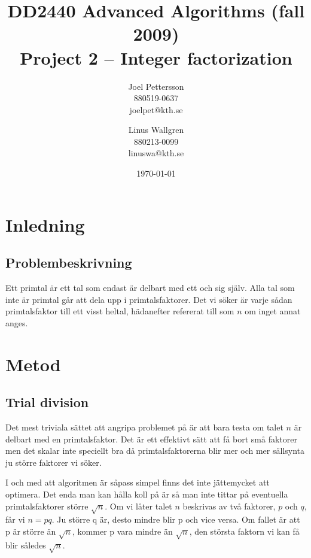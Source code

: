 \documentclass[a4paper,12pt]{article}
\renewcommand{\*}{\ensuremath{\cdot}}
\begin{document}
\title{DD2440 Advanced Algorithms (fall 2009) \\ Project 2 -- Integer
factorization}
\author{Joel Pettersson \\ 880519-0637 \\ joelpet@kth.se \and Linus Wallgren \\
880213-0099  \\ linuswa@kth.se}
\date{\today}
\maketitle
\thispagestyle{empty}
\newpage
\setcounter{page}{1}


\section{Inledning}

\subsection{Problembeskrivning}

Ett primtal är ett tal som endast är delbart med ett och sig själv. Alla tal som
inte är primtal går att dela upp i primtalsfaktorer. Det vi söker är varje sådan
primtalsfaktor till ett visst heltal, hädanefter refererat till som $n$ om inget
annat anges.




\section{Metod}

\subsection{Trial division}

Det mest triviala sättet att angripa problemet på är att bara testa om talet $n$ är delbart med en primtalsfaktor. Det är ett effektivt sätt att få bort små faktorer men det skalar inte speciellt bra då primtalsfaktorerna blir mer och mer sällsynta ju större faktorer vi söker.

I och med att algoritmen är såpass simpel finns det inte jättemycket att optimera. Det enda man kan hålla koll på är så man inte tittar på eventuella primtalsfaktorer större $\sqrt{n}$. Om vi låter talet $n$ beskrivas av två faktorer, $p$ och $q$, får vi $n = pq$. Ju större q är, desto mindre blir p och vice versa. Om fallet är att p är större än $\sqrt{n}$, kommer p vara mindre än $\sqrt{n}$, den största faktorn vi kan få blir således $\sqrt{n}$. 
\end{document}
